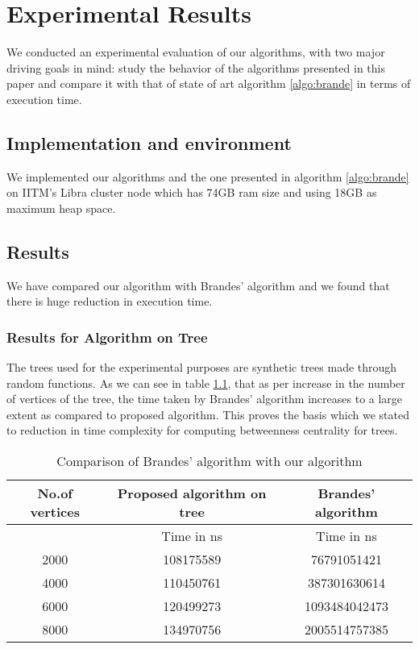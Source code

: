 \chapter{Experimental Results}
\label{chap:results}

We conducted an experimental evaluation of our algorithms, with two major driving goals in mind: study the behavior of the algorithms presented in this paper and compare it with that of state of art algorithm \ref{algo:brande} in terms of execution time.

\section{Implementation and environment}
We implemented our algorithms and the one presented in algorithm \ref{algo:brande} on IITM's Libra cluster node which has 74GB ram size and using 18GB as maximum heap space. 

\vspace{-1.5em}
\section{Results}
We have compared our algorithm with Brandes' algorithm and we found that there is huge reduction in execution time.
\vspace{-1.0em}
\subsection{Results for Algorithm on Tree}
The trees used for the experimental purposes are synthetic trees made through random functions.
As we can see in table \ref{tab:res1}, that as per increase in the number of vertices of the tree, the time taken by Brandes' algorithm increases to a large extent as compared to proposed algorithm. This proves the basis which we stated to reduction in  time complexity for computing betweenness centrality for trees. 

\begin{table}[h!]
\centering
\begin{tabular}{|c|c|c|}
\hline
No.of vertices & Proposed algorithm on tree & Brandes' algorithm \\
\hline
 & Time in ns & Time in ns\\ 
\hline
2000 & 108175589 & 76791051421 \\ 
\hline
4000 & 110450761 & 387301630614 \\ 
\hline
6000 & 120499273 & 1093484042473 \\ 
\hline
8000 & 134970756 & 2005514757385 \\ 
\hline
\end{tabular}
\caption{Comparison of Brandes' algorithm with our algorithm}
\label{tab:res1}
\end{table}

